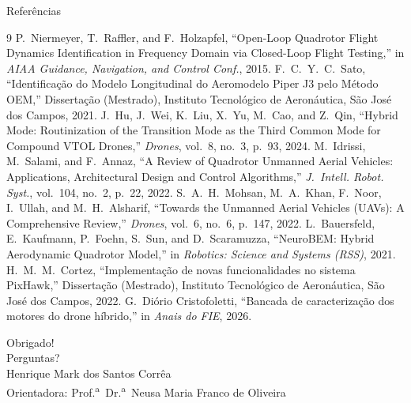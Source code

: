 \documentclass[aspectratio=169,11pt]{beamer}
\newcommand{\orientadora}{Prof.\textsuperscript{a}~Dr.\textsuperscript{a}~Neusa Maria Franco de Oliveira}
\begin{document}
\begin{frame}[allowframebreaks]{Referências}
\begin{thebibliography}{9}
     P.~Niermeyer, T.~Raffler, and F.~Holzapfel, ``Open-Loop Quadrotor Flight Dynamics Identification in Frequency Domain via Closed-Loop Flight Testing,'' in \textit{AIAA Guidance, Navigation, and Control Conf.}, 2015.
     F.~C.~Y.~C.~Sato, ``Identificação do Modelo Longitudinal do Aeromodelo Piper J3 pelo Método OEM,'' Dissertação (Mestrado), Instituto Tecnológico de Aeronáutica, São José dos Campos, 2021.
     J.~Hu, J.~Wei, K.~Liu, X.~Yu, M.~Cao, and Z.~Qin, ``Hybrid Mode: Routinization of the Transition Mode as the Third Common Mode for Compound VTOL Drones,'' \textit{Drones}, vol.~8, no.~3, p.~93, 2024.
     M.~Idrissi, M.~Salami, and F.~Annaz, ``A Review of Quadrotor Unmanned Aerial Vehicles: Applications, Architectural Design and Control Algorithms,'' \textit{J.~Intell. Robot. Syst.}, vol.~104, no.~2, p.~22, 2022.
     S.~A.~H.~Mohsan, M.~A.~Khan, F.~Noor, I.~Ullah, and M.~H.~Alsharif, ``Towards the Unmanned Aerial Vehicles (UAVs): A Comprehensive Review,'' \textit{Drones}, vol.~6, no.~6, p.~147, 2022.
     L.~Bauersfeld, E.~Kaufmann, P.~Foehn, S.~Sun, and D.~Scaramuzza, ``NeuroBEM: Hybrid Aerodynamic Quadrotor Model,'' in \textit{Robotics: Science and Systems (RSS)}, 2021.
     H.~M.~M.~Cortez, ``Implementação de novas funcionalidades no sistema PixHawk,'' Dissertação (Mestrado), Instituto Tecnológico de Aeronáutica, São José dos Campos, 2022.
     G.~Diório Cristofoletti, ``Bancada de caracterização dos motores do drone híbrido,'' in \textit{Anais do FIE}, 2026.
  \end{thebibliography}
\end{frame}

\begin{frame}[plain]
  \centering
  {\Huge \color{itaAzul} Obrigado!}\\[1em]
  {\large Perguntas?}\\[2em]
  \small Henrique Mark dos Santos Corrêa \\
  Orientadora: \orientadora
\end{frame}
\end{document}
